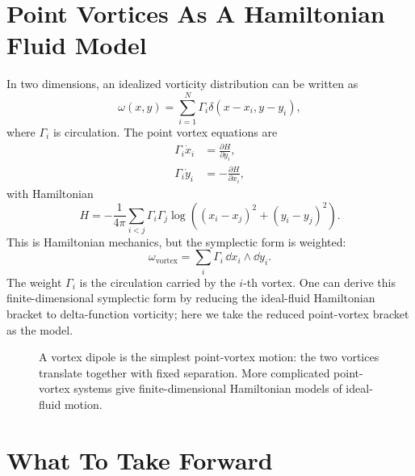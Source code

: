 \section{Point Vortices As A Hamiltonian Fluid Model}
\label{sec:point-vortices}

In two dimensions, an idealized vorticity distribution can be written as
\[
  \omega(x,y)=\sum_{i=1}^{N}\Gamma_i\delta(x-x_i,y-y_i),
\]
where \(\Gamma_i\) is circulation. The point vortex equations are
\[
\begin{aligned}
  \Gamma_i\dot x_i &= \frac{\partial H}{\partial y_i},\\
  \Gamma_i\dot y_i &= -\frac{\partial H}{\partial x_i},
\end{aligned}
\]
with Hamiltonian
\[
  H
  =
  -\frac{1}{4\pi}
  \sum_{i<j}\Gamma_i\Gamma_j
  \log\left((x_i-x_j)^2+(y_i-y_j)^2\right).
\]
This is Hamiltonian mechanics, but the symplectic form is weighted:
\[
  \omega_{\mathrm{vortex}}
  =
  \sum_i \Gamma_i\,\dd x_i\wedge\dd y_i.
\]
The weight \(\Gamma_i\) is the circulation carried by the \(i\)-th vortex. One
can derive this finite-dimensional symplectic form by reducing the ideal-fluid
Hamiltonian bracket to delta-function vorticity; here we take the reduced
point-vortex bracket as the model.

\begin{figure}[htbp]
\centering
{}
\caption{A vortex dipole is the simplest point-vortex motion: the two vortices
translate together with fixed separation. More complicated point-vortex
systems give finite-dimensional Hamiltonian models of ideal-fluid motion.}
\label{fig:vortex-dipole}
\end{figure}

\section{What To Take Forward}
\label{sec:fluid-take-forward}

